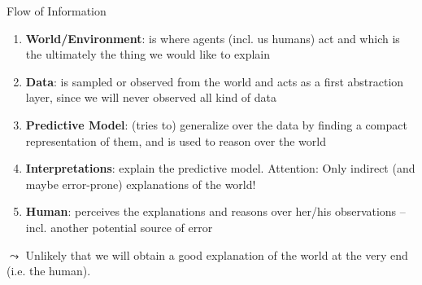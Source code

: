 \documentclass[aspectratio=169]{../latex_main/tntbeamer}  %
\begin{document}
\begin{frame}[c]{Flow of Information}

    \begin{enumerate}
        \item \textbf{World/Environment}: is where agents (incl. us humans) act and which is the ultimately the thing we would like to explain
        \pause\smallskip
        \item \textbf{Data}: is sampled or observed from the world and acts as a first abstraction layer, since we will never observed all kind of data
        \pause\smallskip
        \item \textbf{Predictive Model}: (tries to) generalize over the data by finding a compact representation of them, and is used to reason over the world
        \pause\smallskip
        \item \textbf{Interpretations}: explain the predictive model. Attention: Only indirect (and maybe error-prone) explanations of the world!
        \pause\smallskip
        \item \textbf{Human}: perceives the explanations and reasons over her/his observations -- incl. another potential source of error
    \end{enumerate}
    
    \alert{$\leadsto$ Unlikely that we will obtain a good explanation of the world at the very end (i.e. the human).}
\end{frame}


	
\end{document}
